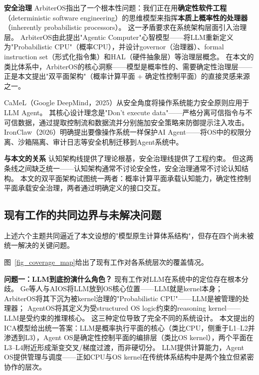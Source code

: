 \textbf{安全治理}
ArbiterOS\cite{arbiteros2025}指出了一个根本性问题：我们正在用\textbf{确定性软件工程}（deterministic software engineering）的思维模型来指挥\textbf{本质上概率性的处理器}（inherently probabilistic processors）。
这一矛盾要求在系统架构层面引入治理层。
ArbiterOS由此提出"Agentic Computer"心智模型——将LLM重新定义为"Probabilistic CPU"（概率CPU），并设计governor（治理器）、formal instruction set（形式化指令集）和HAL（硬件抽象层）等治理层概念。
在本文的类比体系中，ArbiterOS的核心洞察——模型是概率性的、需要确定性治理层——正是本文提出"双平面架构"（概率计算平面 + 确定性控制平面）的直接灵感来源之一。

CaMeL\cite{debenedetti2025camel}（Google DeepMind，2025）从安全角度将操作系统能力安全原则应用于LLM Agent。
其核心设计理念是"Don't execute data"——严格分离可信指令与不可信数据，通过提取控制流和数据流并分别施加安全策略来防御提示注入攻击。
IronClaw\cite{ironclaw2025}（2026）明确提出要像操作系统一样保护AI Agent——将OS中的权限分离、沙箱隔离、审计日志等安全机制迁移到Agent系统中。

\textbf{与本文的关系}
认知架构线提供了理论根基，安全治理线提供了工程约束。
但这两条线之间缺乏统一——认知架构通常不讨论安全性，安全治理通常不讨论认知结构。
本文的双平面架构试图统一两者：概率计算平面承载认知能力，确定性控制平面承载安全治理，两者通过明确定义的接口交互。

\subsection{现有工作的共同边界与未解决问题}
\label{sec:related-gap}

上述六个主题共同逼近了本文设想的"模型原生计算体系结构"，但存在四个尚未被统一解决的关键问题。

图~\ref{fig_coverage_map}给出了现有工作对各系统层次的覆盖情况。


\textbf{问题一：LLM到底扮演什么角色？}
现有工作对LLM在系统中的定位存在根本分歧。
Ge等人与AIOS将LLM放到OS核心位置\cite{ge2023llmos,mei2024aios}——LLM就是kernel本身；
ArbiterOS将其下沉为被kernel治理的"Probabilistic CPU"\cite{arbiteros2025}——LLM是被管理的处理器；
AgentOS将其定义为受structured OS logic约束的reasoning kernel\cite{agentos2025}——LLM是受约束的推理核心。
这三种定位导致了完全不同的系统设计。
本文提出的ICA模型给出统一答案：LLM是概率执行平面的核心（类比CPU，侧重于L1--L2并渗透到L3），Agent OS是确定性控制平面的编排层（类比OS kernel），两个平面在L3--L4附近形成渐变交叉/梯度过渡，而非硬切分。
LLM提供计算能力，Agent OS提供管理与调度——正如CPU与OS kernel在传统体系结构中是两个独立但紧密协作的层次。

